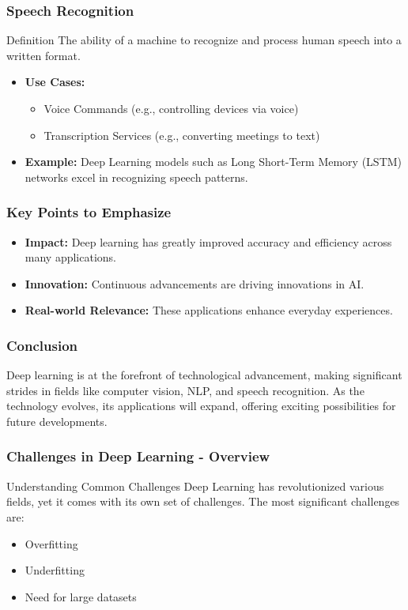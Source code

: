 \documentclass[aspectratio=169]{beamer}
\begin{document}
\begin{frame}[fragile]
    \frametitle{Speech Recognition}
    \begin{block}{Definition}
        The ability of a machine to recognize and process human speech into a written format.
    \end{block}
    \begin{itemize}
        \item \textbf{Use Cases:}
            \begin{itemize}
                \item Voice Commands (e.g., controlling devices via voice)
                \item Transcription Services (e.g., converting meetings to text)
            \end{itemize}
        \item \textbf{Example:} 
            Deep Learning models such as Long Short-Term Memory (LSTM) networks excel in recognizing speech patterns.
    \end{itemize}
\end{frame}

\begin{frame}[fragile]
    \frametitle{Key Points to Emphasize}
    \begin{itemize}
        \item \textbf{Impact:} Deep learning has greatly improved accuracy and efficiency across many applications.
        \item \textbf{Innovation:} Continuous advancements are driving innovations in AI.
        \item \textbf{Real-world Relevance:} These applications enhance everyday experiences.
    \end{itemize}
\end{frame}

\begin{frame}[fragile]
    \frametitle{Conclusion}
    Deep learning is at the forefront of technological advancement, making significant strides in fields like computer vision, NLP, and speech recognition. As the technology evolves, its applications will expand, offering exciting possibilities for future developments.
\end{frame}

\begin{frame}[fragile]
    \frametitle{Challenges in Deep Learning - Overview}
    \begin{block}{Understanding Common Challenges}
        Deep Learning has revolutionized various fields, yet it comes with its own set of challenges. 
        The most significant challenges are:
        \begin{itemize}
            \item Overfitting
            \item Underfitting
            \item Need for large datasets
        \end{itemize}
    \end{block}
\end{frame}
\end{document}
